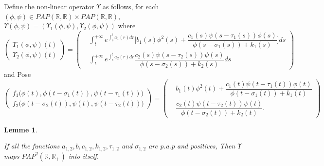 \documentclass[[a4paper,10pt]{article}
\newcommand{\R}{\mathbb{R}}
\newtheorem{lemma}[theorem]{Lemme}%
\begin{document}
Define the non-linear operator $\Upsilon$  as follows, for each $(\phi,\psi)\in PAP(\R,\R)\times PAP(\R,\R)$,\\ $\Upsilon(\phi,\psi)=(\Upsilon_1(\phi,\psi),\Upsilon_2(\phi,\psi))$ where {\small
\[ \left (\begin{aligned}\Upsilon_1(\phi,\psi)(t)\\\Upsilon_2(\phi,\psi)(t)\end{aligned}
\right )=
\left (\begin{aligned}&\int^{+\infty}_te^{\int^t_s a_1(r)dr}\bigg[b_1(s)\phi^2(s)+\dfrac{c_1(s)\psi(s-\tau_1(s))\phi(s)}{\phi(s-\sigma_1(s))+k_1(s)}\bigg]ds\\&\int^{+\infty}_t e^{\int^t_s a_2(r)dr}\dfrac{c_2(s)\psi(s-\tau_2(s))\psi(s)}{\phi(s-\sigma_2(s))+k_2(s)}ds
\end{aligned}
\right)
\]}
and Pose
{\small
\[ \left (\begin{aligned}
f_1\big(\phi(t),\phi(t-\sigma_1(t)),\psi(t-\tau_1(t))\big)\\
f_2\big(\phi(t-\sigma_2(t)),\psi(t),\psi(t-\tau_2(t))\big)
\end{aligned}
\right )=
\left (\begin{aligned}
&b_1(t)\phi^2(t)+\dfrac{c_1(t)\psi(t-\tau_1(t))\phi(t)}{\phi(t-\sigma_1(t))+k_1(t)}\\
&\dfrac{c_2(t)\psi(t-\tau_2(t))\psi(t)}{\phi(t-\sigma_2(t))+k_2(t)}.\end{aligned}
\right)
\]}

\begin{lemma}\label{PAP2}\item
If all the functions $a_{1,2},b,c_{1,2},k_{1,2},\tau_{1,2}$ and $\sigma_{1,2}$ are p.a.p and positives,  Then $\Upsilon$ maps $PAP^2(\R,\R_+)$ into itself.
\end{lemma}
\end{document}
